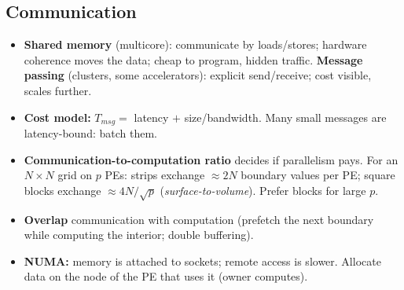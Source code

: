 \subsection{Communication}\label{sec:comm}
\begin{itemize}
\item \textbf{Shared memory} (multicore): communicate by loads/stores; hardware coherence moves the data; cheap to program, hidden traffic. \textbf{Message passing} (clusters, some accelerators): explicit send/receive; cost visible, scales further.
\item \textbf{Cost model:} $T_{msg}=$ latency $+$ size/bandwidth. Many small messages are latency-bound: batch them.
\item \textbf{Communication-to-computation ratio} decides if parallelism pays. For an $N\times N$ grid on $p$ PEs: strips exchange $\approx 2N$ boundary values per PE; square blocks exchange $\approx 4N/\sqrt{p}$ (\emph{surface-to-volume}). Prefer blocks for large $p$.
\item \textbf{Overlap} communication with computation (prefetch the next boundary while computing the interior; double buffering).
\item \textbf{NUMA:} memory is attached to sockets; remote access is slower. Allocate data on the node of the PE that uses it (owner computes).
\end{itemize}

